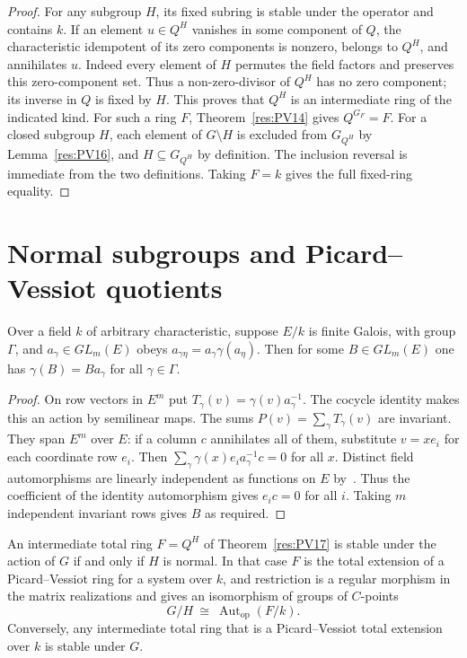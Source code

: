 \begin{proof}
For any subgroup \(H\), its fixed subring is stable under the
operator and contains \(k\). If an element \(u\in Q^H\) vanishes
in some component of \(Q\), the characteristic idempotent
of its zero components is nonzero, belongs to \(Q^H\), and
annihilates \(u\). Indeed every element of \(H\) permutes
the field factors and preserves this zero-component set.
Thus a non-zero-divisor of \(Q^H\) has no zero component;
its inverse in \(Q\) is fixed by \(H\). This proves that
\(Q^H\) is an intermediate ring of the indicated kind.
For such a ring \(F\), Theorem~\ref{res:PV14} gives \(Q^{G_F}=F\).
For a closed subgroup \(H\), each element of \(G\setminus H\)
is excluded from \(G_{Q^H}\) by Lemma~\ref{res:PV16}, and
\(H\subseteq G_{Q^H}\) by definition. The inclusion reversal
is immediate from the two definitions. Taking \(F=k\) gives
the full fixed-ring equality.
\end{proof}

\section{Normal subgroups and Picard--Vessiot quotients}

\begin{lemma}
\label{res:PV18}
Over a field \(k\) of arbitrary characteristic, suppose \(E/k\) is
finite Galois, with group \(\Gamma\), and \(a_\gamma\in GL_m(E)\) obeys
\(a_{\gamma\eta}=a_\gamma\gamma(a_\eta)\).
Then for some \(B\in GL_m(E)\) one has
\(\gamma(B)=B a_\gamma\) for all \(\gamma\in\Gamma\).
\end{lemma}

\begin{proof}
On row vectors in \(E^m\) put \(T_\gamma(v)=\gamma(v)a_\gamma^{-1}\).
The cocycle identity makes this an action by semilinear maps.
The sums \(P(v)=\sum_\gamma T_\gamma(v)\) are invariant.
They span \(E^m\) over \(E\): if a column \(c\) annihilates all
of them, substitute \(v=x e_i\) for each coordinate row \(e_i\).
Then \(\sum_\gamma \gamma(x)e_i a_\gamma^{-1}c=0\) for all \(x\).
Distinct field automorphisms are linearly independent as functions
on \(E\) by~\cite[Lemma 16.6, PDF p.~125]{mg-d07}.
Thus the coefficient of the identity automorphism gives
\(e_i c=0\) for all \(i\).
Taking \(m\) independent invariant rows gives \(B\) as required.
\end{proof}

\begin{theorem}
\label{res:PV19}
An intermediate total ring \(F=Q^H\) of Theorem~\ref{res:PV17}
is stable under the action of \(G\) if and only if \(H\)
is normal. In that case \(F\) is the total extension of a
Picard--Vessiot ring for a system over \(k\), and restriction
is a regular morphism in the matrix realizations and gives an
isomorphism of groups of \(C\)-points
\[
 G/H \ \cong\ \operatorname{Aut}_{\mathrm{op}}(F/k).
\]
Conversely, any intermediate total ring that is a
Picard--Vessiot total extension over \(k\) is stable under \(G\).
\end{theorem}

